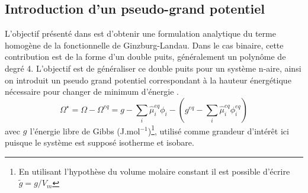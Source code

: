\subsection{Introduction d'un pseudo-grand potentiel}
L'objectif présenté dans \cite{rasolofomanana_numerical_nodate} est d'obtenir une formulation analytique du terme homogène de la fonctionnelle de Ginzburg-Landau. Dans le cas binaire, cette contribution est de la forme d'un double puits, généralement un polynôme de degré 4.
L'objectif est de généraliser ce double puits pour un système n-aire, ainsi on introduit un pseudo grand potentiel correspondant à la hauteur énergétique nécessaire pour changer de minimum d'énergie \cite{cardon_modelisation_2016}.
\begin{equation}
\Omega^{\star} =\Omega - \Omega^{eq} =  {g} - \sum_i \hat{\mu}_i^{eq}\phi_i - \left(  {g}^{eq} -  \sum_i \hat{\mu}_i^{eq}\phi_i^{eq} \right) 
\end{equation}
avec ${g}^{}$ l'énergie libre de Gibbs (J.mol$^{-1}$)\footnote{En utilisant l'hypothèse du volume molaire constant il est possible d'écrire $\tilde{g} = {g}/{V_m}$}, utilisé comme grandeur d'intérêt ici puisque le système est supposé isotherme et isobare.
